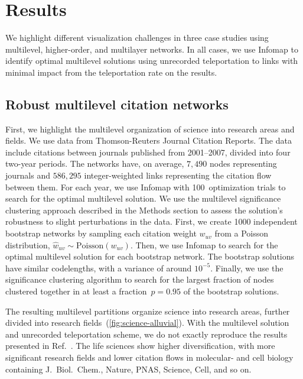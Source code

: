 \documentclass[aps,rmp,floats,floatfix,twocolumn,superscriptaddress,final]{revtex4-2}
\begin{document}
\section*{Results}

We highlight different visualization challenges in three case studies using multilevel, higher-order, and multilayer networks.
In all cases, we use Infomap to identify optimal multilevel solutions using unrecorded teleportation to links with minimal impact from the teleportation rate on the results.\cite{lambiotte2012ranking}


\subsection*{Robust multilevel citation networks}


First, we highlight the multilevel organization of science into research areas and fields.
We use data from Thomson-Reuters Journal Citation Reports.\cite{rosvall2010mapping}
The data include citations between journals published from 2001--2007, divided into four two-year periods.
The networks have, on average, $7,490$ nodes representing journals and $586,295$ integer-weighted links representing the citation flow between them.
For each year, we use Infomap with 100~optimization trials to search for the optimal multilevel solution.
We use the multilevel significance clustering approach described in the Methods section to assess the solution's robustness to slight perturbations in the data.
First, we create 1000 independent bootstrap networks by sampling each citation weight $w_{uv}$ from a Poisson distribution, $\hat{w}_{uv} \sim \text{Poisson}(w_{uv})$.
Then, we use Infomap to search for the optimal multilevel solution for each bootstrap network.
The bootstrap solutions have similar codelengths, with a variance of around $10^{-5}$.
Finally, we use the significance clustering algorithm to search for the largest fraction of nodes clustered together in at least a fraction~$p=0.95$ of the bootstrap solutions.

%


The resulting multilevel partitions organize science into research areas, further divided into research fields~(\cref{fig:science-alluvial}).
With the multilevel solution and unrecorded teleportation scheme, we do not exactly reproduce the results presented in Ref.~.
The life sciences show higher diversification, with more significant research fields and lower citation flows in molecular- and cell biology containing J.~Biol.~Chem., Nature, PNAS, Science, Cell, and so on.
\end{document}
